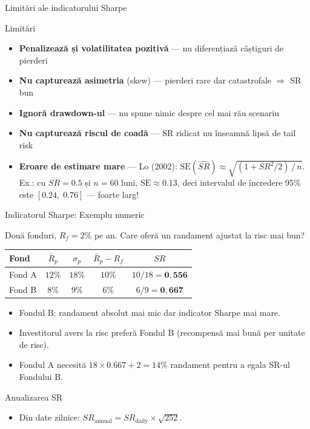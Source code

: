 \documentclass[9pt, aspectratio=169, t]{beamer}
\theoremstyle{definition}
\begin{document}
\begin{frame}{Limitări ale indicatorului Sharpe}
\begin{alertblock}{Limitări}
\begin{itemize}\setlength{\itemsep}{2pt}
    \item \textbf{Penalizează și volatilitatea pozitivă} --- nu diferențiază câștiguri de pierderi
    \item \textbf{Nu capturează asimetria} (skew) --- pierderi rare dar catastrofale $\Rightarrow$ SR bun
    \item \textbf{Ignoră drawdown-ul} --- nu spune nimic despre cel mai rău scenariu
    \item \textbf{Nu capturează riscul de coadă} --- SR ridicat nu înseamnă lipsă de tail risk
    \item \textbf{Eroare de estimare mare} --- Lo (2002): $\text{SE}(\widehat{SR}) \approx \sqrt{(1 + SR^2/2)\,/\,n}$. Ex.: cu $SR=0.5$ și $n=60$ luni, $\text{SE}\approx 0.13$, deci intervalul de încredere 95\% este $[0.24,\;0.76]$ --- foarte larg!
\end{itemize}
\end{alertblock}
\end{frame}

\begin{frame}{Indicatorul Sharpe: Exemplu numeric}
\begin{example}
Două fonduri, $R_f = 2\%$ pe an. Care oferă un randament ajustat la risc mai bun?
\end{example}
\vspace{0.05cm}
\begin{center}
{\small
\renewcommand{\arraystretch}{1.2}
\begin{tabular}{lcccc}
\toprule
\textbf{Fond} & $\bar{R}_p$ & $\sigma_p$ & $\bar{R}_p - R_f$ & $SR$ \\
\midrule
Fond A & $12\%$ & $18\%$ & $10\%$ & $10/18 = \mathbf{0{,}556}$ \\
Fond B & $8\%$ & $9\%$ & $6\%$ & $6/9 = \mathbf{0{,}667}$ \\
\bottomrule
\end{tabular}
}
\end{center}
\vspace{0.05cm}
\begin{itemize}
    \item Fondul B: randament absolut mai mic dar indicator Sharpe mai mare.
    \item Investitorul avers la risc preferă Fondul B (recompensă mai bună per unitate de risc).
    \item Fondul A necesită $18\times0.667+2=14\%$ randament pentru a egala SR-ul Fondului B.
\end{itemize}
\begin{block}{Anualizarea SR}
\begin{itemize}
\item Din date zilnice: $SR_{\text{annual}} = SR_{\text{daily}} \times \sqrt{252}$.
\end{itemize}
\end{block}
\end{frame}
\end{document}
